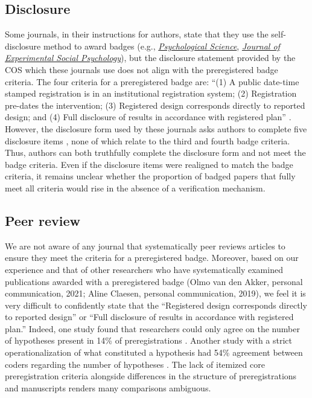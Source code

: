 \documentclass[authordate, meta]{jote-new-article}
\begin{document}
\subsection{Disclosure}

Some journals, in their instructions for authors, state that they use the self-disclosure method to award badges (e.g., \href{https://www.psychologicalscience.org/publications/psychological_science/ps-submissions}{\emph{Psychological Science}}, \href{https://www.elsevier.com/journals/journal-of-experimental-social-psychology/0022-1031/guide-for-authors}{\emph{Journal of Experimental Social Psychology}}), but the disclosure statement provided by the COS which these journals use does not align with the preregistered badge criteria. The four criteria for a preregistered badge are: “(1) A public date-time stamped registration is in an institutional registration system; (2) Registration pre-dates the intervention; (3) Registered design corresponds directly to reported design; and (4) Full disclosure of results in accordance with registered plan” \parencites{COS2019}. However, the disclosure form used by these journals asks authors to complete five disclosure items \parencites{COS2016}, none of which relate to the third and fourth badge criteria. Thus, authors can both truthfully complete the disclosure form and not meet the badge criteria. Even if the disclosure items were realigned to match the badge criteria, it remains unclear whether the proportion of badged papers that fully meet all criteria would rise in the absence of a verification mechanism.







\subsection{Peer review}

We are not aware of any journal that systematically peer reviews articles to ensure they meet the criteria for a preregistered badge. Moreover, based on our experience \parencites{TARG2022} and that of other researchers who have systematically examined publications awarded with a preregistered badge (Olmo van den Akker, personal communication, 2021; Aline Claesen, personal communication, 2019), we feel it is very difficult to confidently state that the “Registered design corresponds directly to reported design” or “Full disclosure of results in accordance with registered plan.” Indeed, one study found that researchers could only agree on the number of hypotheses present in 14\% of preregistrations \parencites{Bakker2020}. Another study with a strict operationalization of what constituted a hypothesis had 54\% agreement between coders regarding the number of hypotheses \parencites{vandenAkker2022}. The lack of itemized core preregistration criteria alongside differences in the structure of preregistrations and manuscripts renders many comparisons ambiguous.
\end{document}
